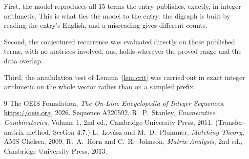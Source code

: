 \documentclass[11pt,a4paper]{article}
\theoremstyle{plain}
\theoremstyle{definition}
\begin{document}
First, the model reproduces all $15$ terms the entry publishes, exactly, in integer
arithmetic. This is what ties the model to the entry: the digraph is built by reading the
entry's English, and a misreading gives different counts.

Second, the conjectured recurrence was evaluated directly on those published terms, with no
matrices involved, and holds wherever the proved range and the data overlap.

Third, the annihilation test of Lemma~\ref{lem:crit} was carried out in exact integer
arithmetic on the whole vector rather than on a sampled prefix.

\begin{thebibliography}{9}
 The OEIS Foundation, \emph{The On-Line Encyclopedia of Integer
Sequences}, \url{https://oeis.org}, 2026. Sequence A220592.
 R.~P.~Stanley, \emph{Enumerative Combinatorics}, Volume 1, 2nd ed.,
Cambridge University Press, 2011. (Transfer-matrix method, Section 4.7.)
 L.~Lov\'asz and M.~D.~Plummer, \emph{Matching Theory}, AMS Chelsea,
2009.
 R.~A.~Horn and C.~R.~Johnson, \emph{Matrix Analysis}, 2nd ed., Cambridge
University Press, 2013.
\end{thebibliography}
\end{document}
